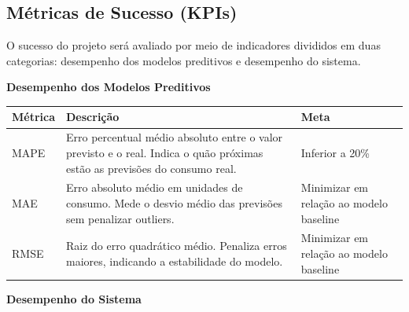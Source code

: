 \documentclass[12pt,a4paper]{article}
\begin{document}
\subsection{Métricas de Sucesso (KPIs)}

O sucesso do projeto será avaliado por meio de indicadores divididos em
duas categorias: desempenho dos modelos preditivos e desempenho do sistema.

\vspace{0.3cm}
\noindent\textbf{Desempenho dos Modelos Preditivos}

\begin{center}
    \begin{tabular}{p{} p{} p{}}
        \toprule
        \textbf{Métrica}                                            & \textbf{Descrição}                                              & \textbf{Meta} \\
        \midrule
        MAPE                                                        & Erro percentual médio absoluto entre o valor previsto e o real.
        Indica o quão próximas estão as previsões do consumo real.  &
        Inferior a 20\%                                                                                                                               \\
        \midrule
        MAE                                                         & Erro absoluto médio em unidades de consumo.
        Mede o desvio médio das previsões sem penalizar outliers.   &
        Minimizar em relação ao modelo baseline                                                                                                       \\
        \midrule
        RMSE                                                        & Raiz do erro quadrático médio.
        Penaliza erros maiores, indicando a estabilidade do modelo. &
        Minimizar em relação ao modelo baseline                                                                                                       \\
        \bottomrule
    \end{tabular}
\end{center}

\vspace{0.3cm}
\noindent\textbf{Desempenho do Sistema}
\end{document}
